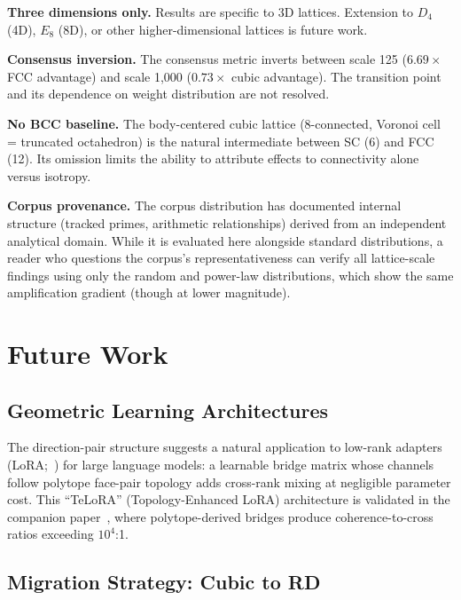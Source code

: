 \documentclass[11pt]{article}
\begin{document}
\textbf{Three dimensions only.} Results are specific to 3D
lattices. Extension to $D_4$ (4D), $E_8$ (8D), or other
higher-dimensional lattices is future work.

\textbf{Consensus inversion.} The consensus metric inverts between
scale 125 ($6.69\times$ FCC advantage) and scale 1{,}000
($0.73\times$ cubic advantage). The transition point and its
dependence on weight distribution are not resolved.

\textbf{No BCC baseline.} The body-centered cubic lattice (8-connected,
Voronoi cell = truncated octahedron) is the natural intermediate
between SC (6) and FCC (12). Its omission limits the ability to
attribute effects to connectivity alone versus isotropy.

\textbf{Corpus provenance.} The corpus distribution has documented
internal structure (tracked primes, arithmetic relationships)
derived from an independent analytical domain. While it is
evaluated here alongside standard distributions, a reader who
questions the corpus's representativeness can verify all
lattice-scale findings using only the random and power-law
distributions, which show the same amplification gradient (though
at lower magnitude).

\section{Future Work}
\label{sec:future}

\subsection{Geometric Learning Architectures}

The direction-pair structure suggests a natural application to
low-rank adapters (LoRA;~\citealt{hu2022lora}) for large language models: a learnable
bridge matrix whose channels follow polytope face-pair topology
adds cross-rank mixing at negligible parameter cost.
This ``TeLoRA'' (Topology-Enhanced LoRA) architecture is validated in the
companion paper~\cite{bielec2026bridge}, where polytope-derived bridges
produce coherence-to-cross ratios exceeding $10^4$:1.

\subsection{Migration Strategy: Cubic to RD}
\label{sec:migration}
\end{document}
